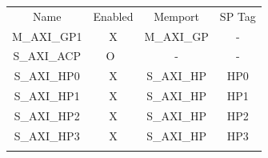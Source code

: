 \documentclass[a4paper, twoside, 11pt]{article}
\begin{document}
\begin{appendices}
\begin{table}[H]
			\begin{tabular}{!{\vrule width 2pt} c | c | c | c !{\vrule width 2pt}}
			Name & Enabled & Memport & SP Tag\\
			M\_AXI\_GP1 & X & M\_AXI\_GP & -\\ \hline
			S\_AXI\_ACP & O~& - & - \\ \hline
			S\_AXI\_HP0 & X & S\_AXI\_HP & HP0 \\ \hline
			S\_AXI\_HP1 & X & S\_AXI\_HP & HP1 \\ \hline
			S\_AXI\_HP2 & X & S\_AXI\_HP & HP2 \\ \hline
			S\_AXI\_HP3 & X & S\_AXI\_HP & HP3 \\
			\end{tabular}
			\label{tab:vivado-platform-setup-axi-digilent-zybo}
		\end{table}


\end{appendices}
\end{document}

